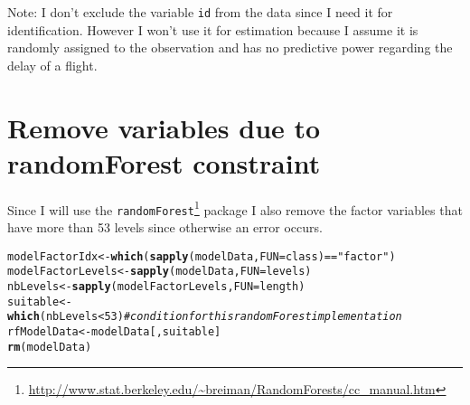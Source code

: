\documentclass{article}\usepackage[]{graphicx}\usepackage[]{color}
\makeatletter
\newcommand{\hlnum}[1]{\textcolor[rgb]{0.686,0.059,0.569}{#1}}%
\newcommand{\hlstr}[1]{\textcolor[rgb]{0.192,0.494,0.8}{#1}}%
\newcommand{\hlcom}[1]{\textcolor[rgb]{0.678,0.584,0.686}{\textit{#1}}}%
\newcommand{\hlopt}[1]{\textcolor[rgb]{0,0,0}{#1}}%
\newcommand{\hlstd}[1]{\textcolor[rgb]{0.345,0.345,0.345}{#1}}%
\newcommand{\hlkwb}[1]{\textcolor[rgb]{0.69,0.353,0.396}{#1}}%
\newcommand{\hlkwc}[1]{\textcolor[rgb]{0.333,0.667,0.333}{#1}}%
\newcommand{\hlkwd}[1]{\textcolor[rgb]{0.737,0.353,0.396}{\textbf{#1}}}%
\newenvironment{kframe}{%
 \def\at@end@of@kframe{}%
 \ifinner\ifhmode%
  \def\at@end@of@kframe{\end{minipage}}%
  \begin{minipage}{\columnwidth}%
 \fi\fi%
 \def\FrameCommand##1{\hskip\@totalleftmargin \hskip-\fboxsep
 \colorbox{shadecolor}{##1}\hskip-\fboxsep
     \hskip-\linewidth \hskip-\@totalleftmargin \hskip\columnwidth}%
 \MakeFramed {\advance\hsize-\width
   \@totalleftmargin\z@ \linewidth\hsize
   \@setminipage}}%
 {\par\unskip\endMakeFramed%
 \at@end@of@kframe}
\newenvironment{knitrout}{}{} %
\makeatother
\begin{document}
Note: I don't exclude the variable \verb+id+ from the data since I need it for identification. However I won't use it for estimation because I assume it is randomly assigned to the observation and has no predictive power regarding the delay of a flight.

\section{Remove variables due to randomForest constraint}

Since I will use the \verb+randomForest+\footnote{\url{http://www.stat.berkeley.edu/~breiman/RandomForests/cc_manual.htm}} package I also remove the factor variables that have more than 53 levels since otherwise an error occurs.
\begin{knitrout}
\color{fgcolor}\begin{kframe}
\begin{alltt}
\hlstd{modelFactorIdx} \hlkwb{<-} \hlkwd{which}\hlstd{(}\hlkwd{sapply}\hlstd{(modelData,} \hlkwc{FUN}\hlstd{=class)} \hlopt{==} \hlstr{"factor"}\hlstd{)}
\hlstd{modelFactorLevels} \hlkwb{<-} \hlkwd{sapply}\hlstd{(modelData,} \hlkwc{FUN}\hlstd{=levels)}
\hlstd{nbLevels} \hlkwb{<-} \hlkwd{sapply}\hlstd{(modelFactorLevels,} \hlkwc{FUN}\hlstd{=length)}
\hlstd{suitable} \hlkwb{<-} \hlkwd{which}\hlstd{(nbLevels} \hlopt{<} \hlnum{53}\hlstd{)} \hlcom{# condition for this randomForest implementation}
\hlstd{rfModelData} \hlkwb{<-} \hlstd{modelData[,suitable]}
\hlkwd{rm}\hlstd{(modelData)}
\end{alltt}
\end{kframe}
\end{knitrout}
\end{document}
